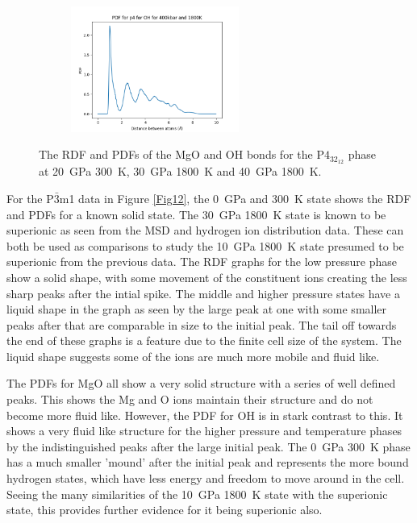 \documentclass[a4paper,12pt]{article}
\begin{document}
\begin{figure}[h!!!!!!!!!!]
\begin{subfigure}{0.32\textwidth}
		\label{Fig13h}
	\end{subfigure}%
	\begin{subfigure}{0.32\textwidth}
		\centering
		\includegraphics[width=5.5cm]{figures/p4_pdf_OH_p400_t1800.png}
		\label{Fig13i}
	\end{subfigure}%
	\caption{The RDF and PDFs of the MgO and OH bonds for the P$4_32_12$ phase at \SI{20}{\GPa} \SI{300}{\K}, \SI{30}{\GPa} \SI{1800}{\K} and \SI{40}{\GPa} \SI{1800}{\K}.}
	\label{Fig13}
\end{figure}

For the P$\bar3$m1 data in Figure \ref{Fig12}, the \SI{0}{\GPa} and \SI{300}{\K} state shows the RDF and PDFs for a known solid state. The \SI{30}{\GPa} \SI{1800}{\K} state is known to be superionic as seen from the MSD and hydrogen ion distribution data. These can both be used as comparisons to study the \SI{10}{\GPa} \SI{1800}{\K} state presumed to be superionic from the previous data. The RDF graphs for the low pressure phase show a solid shape, with some movement of the constituent ions creating the less sharp peaks after the intial spike. The middle and higher pressure states have a liquid shape in the graph as seen by the large peak at one with some smaller peaks after that are comparable in size to the initial peak. The tail off towards the end of these graphs is a feature due to the finite cell size of the system. The liquid shape suggests some of the ions are much more mobile and fluid like.

The PDFs for MgO all show a very solid structure with a series of well defined peaks. This shows the Mg and O ions maintain their structure and do not  become more fluid like. However, the PDF for OH is in stark contrast to this. It shows a very fluid like structure for the higher pressure and temperature phases by the indistinguished peaks after the large initial peak. The \SI{0}{\GPa} \SI{300}{\K} phase has a much smaller 'mound' after the initial peak and represents the more bound hydrogen states, which have less energy and freedom to move around in the cell. Seeing the many similarities of the \SI{10}{\GPa} \SI{1800}{\K} state with the superionic state, this provides further evidence for it being superionic also.
\end{document}
